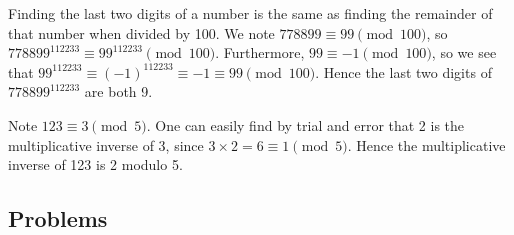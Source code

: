 \begin{questions}
    \item Finding the last two digits of a number is the same as finding the remainder of that number when divided by 100. We note $778899 \equiv 99 \pmod{100}$, so $778899^{112233} \equiv 99^{112233} \pmod{100}$. Furthermore, $99 \equiv -1 \pmod{100}$, so we see that $99^{112233}\equiv (-1)^{112233} \equiv -1 \equiv 99 \pmod{100}$. Hence the last two digits of $778899^{112233}$ are both 9.

    \item Note $123 \equiv 3 \pmod 5$. One can easily find by trial and error that 2 is the multiplicative inverse of 3, since $3 \times 2 = 6 \equiv 1 \pmod 5$. Hence the multiplicative inverse of 123 is 2 modulo 5.
\end{questions}

\subsection*{Problems}
